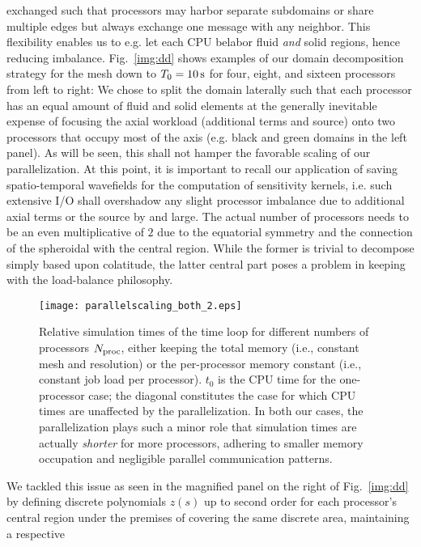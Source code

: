\documentclass[11pt,letter,fleqn,english,notitlepage]{article}
\begin{document}
exchanged such that processors may harbor separate subdomains or share 
multiple edges but always exchange one message with any neighbor. 
This flexibility enables us to e.g. let each CPU belabor fluid {\it and} solid regions, 
hence reducing imbalance.
%
Fig.~\ref{img:dd} shows examples of our domain decomposition strategy 
for the mesh down to $T_0=10\,{\rm s}$ for four, eight, and sixteen 
processors from left to right: 
We chose to split the domain laterally such that each processor has an 
equal amount of fluid and solid elements at the generally inevitable expense of 
focusing the axial workload (additional terms and source) onto two 
processors that occupy most of the axis (e.g. black and green domains in the 
left panel). 
%
As will be seen, this shall not hamper the favorable scaling of 
our parallelization. At this point, it is important to recall our application of 
saving spatio-temporal wavefields for the computation of sensitivity kernels, 
i.e. such extensive I/O shall overshadow any slight processor imbalance due to
additional axial terms or the source by and large. 
The actual number of processors needs to be an even 
multiplicative of $2$ due to the equatorial symmetry and the connection
of the spheroidal with the central region. While the former is trivial to 
decompose simply based upon colatitude, the latter central part poses 
a problem in keeping with the load-balance philosophy.
%
\begin{figure}[tb!]
\begin{center}
\texttt{[image: parallelscaling\_both\_2.eps]}
\caption{Relative simulation times of the time loop for different numbers of processors 
$N_{\rm proc}$, either keeping the total memory (i.e., constant mesh and resolution) 
or the per-processor memory constant (i.e., constant job load per processor). $t_0$ 
is the CPU time for the one-processor case;
the diagonal constitutes the case for which CPU times are unaffected by the parallelization. 
In both our cases, the parallelization 
plays such a minor role that simulation times are actually \textit{shorter} for more processors, 
adhering to smaller memory occupation and negligible parallel communication patterns.} 
\label{img:scaling}
\end{center}
\end{figure}
%
We tackled this issue as seen in the magnified panel on the right of 
Fig.~\ref{img:dd} by defining discrete polynomials $z(s)$ up to 
second order for each processor's central region under the premises of 
covering the same discrete area, maintaining a respective 
\end{document}
